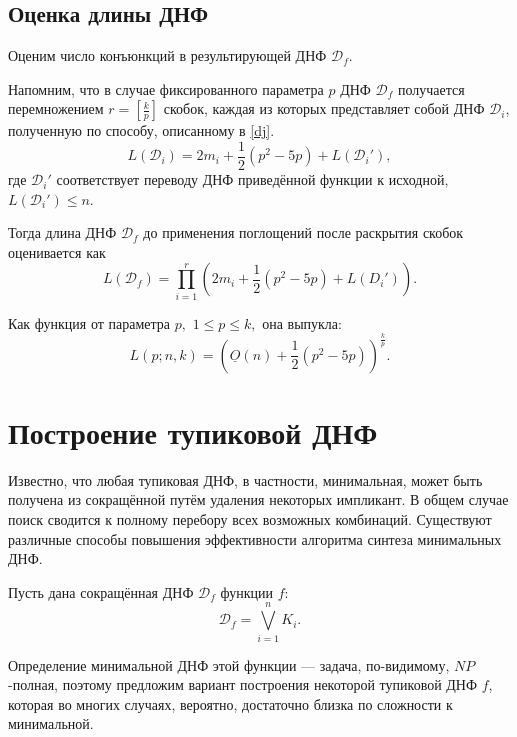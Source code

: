 \documentclass[12pt,a4paper,oneside,fleqn,leqno]{article}
\theoremstyle{definition}
\begin{document}
		\subsection{Оценка длины ДНФ}
			Оценим число конъюнкций в результирующей ДНФ $\mathcal{D}_f.$\par
			Напомним, что в случае фиксированного параметра $p$ ДНФ $\mathcal{D}_f$ получается перемножением $r = \left [ \frac{k}{p}\right ]$ скобок, каждая из которых представляет собой ДНФ $\mathcal{D}_i$, полученную по способу, описанному в \ref{dj}. 
			$$L(\mathcal{D}_i) = 2m_i + \frac{1}{2}(p^2 - 5p) + L(\mathcal{D}_i'),$$
			где $\mathcal{D}_i'$ соответствует переводу ДНФ приведённой функции к исходной, $L(\mathcal{D}_i') \leqslant n$.\par
			Тогда длина ДНФ $\mathcal{D}_f$ до применения поглощений после раскрытия скобок оценивается как
			$$
				L(\mathcal{D}_f) = \prod_{i = 1}^{r} \left(2m_i + \frac{1}{2}(p^2 - 5p) + L(D_i') \right).
			$$\par
			Как функция от параметра $p,\,\,1 \leqslant p \leqslant k,$ она выпукла:
			$$
				L(p; n, k) = \left( \underline{O}(n) + \frac{1}{2}(p^2 - 5p)\right)^{\frac{k}{p}}.
			$$
	\section{Построение тупиковой ДНФ}
		Известно, что любая тупиковая ДНФ, в частности, минимальная, может быть получена из сокращённой путём удаления некоторых импликант. В общем случае поиск сводится к полному перебору всех возможных комбинаций. Существуют различные способы повышения эффективности алгоритма синтеза минимальных ДНФ.\par
		Пусть дана сокращённая ДНФ $\mathcal{D}_{f}$ функции $f$:
		$$
			\mathcal{D}_{f} = \bigvee_{i = 1}^{n} K_{i}.
		$$ \par
		Определение минимальной ДНФ этой функции --- задача, по-видимому, $NP$-полная, поэтому предложим вариант построения некоторой тупиковой ДНФ $f$, которая во многих случаях, вероятно, достаточно близка по сложности к минимальной.
\end{document}

